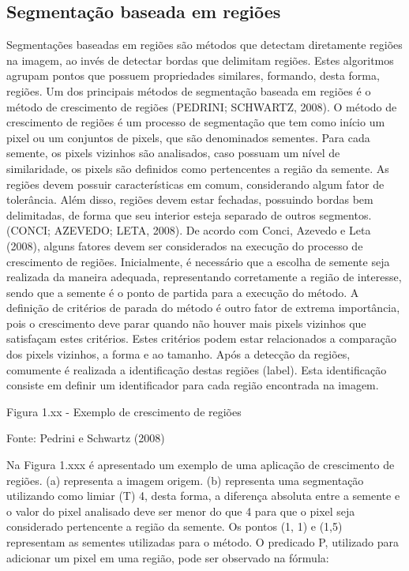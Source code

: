 \documentclass[
	12pt,				%
	oneside,			%
	a4paper,			%
	english,			%
	french,				%
	spanish,			%
	brazil,				%
	]{abntex2}
\begin{document}
\subsection{Segmentação baseada em regiões}     

	Segmentações baseadas em regiões são métodos que detectam diretamente regiões na imagem, ao invés de detectar bordas que delimitam regiões. Estes algoritmos agrupam pontos que possuem propriedades similares, formando, desta forma, regiões. Um dos principais métodos de segmentação baseada em regiões é o método de crescimento de regiões (PEDRINI; SCHWARTZ, 2008).
	O método de crescimento de regiões é um processo de segmentação que tem como início um pixel ou um conjuntos de pixels, que são denominados sementes. Para cada semente, os pixels vizinhos são analisados, caso possuam um nível de similaridade, os pixels são definidos como pertencentes a região da semente. As regiões devem possuir características em comum, considerando algum fator de tolerância. Além disso, regiões devem estar fechadas, possuindo bordas bem delimitadas, de forma que seu interior esteja separado de outros segmentos. (CONCI; AZEVEDO; LETA, 2008).
De acordo com Conci, Azevedo e Leta (2008), alguns fatores devem ser considerados na execução do processo de crescimento de regiões. Inicialmente, é necessário que a escolha de semente seja realizada da maneira adequada, representando corretamente a região de interesse, sendo que a semente é o ponto de partida para a execução do método. A definição de critérios de parada do método é outro fator de extrema importância, pois o crescimento deve parar quando não houver mais pixels vizinhos que satisfaçam estes critérios. Estes critérios podem estar relacionados a comparação dos pixels vizinhos, a forma e ao tamanho.
Após a detecção da regiões, comumente é realizada a identificação destas regiões (label). Esta identificação consiste em definir um identificador para cada região encontrada na imagem. 

Figura 1.xx - Exemplo de crescimento de regiões

Fonte: Pedrini e Schwartz (2008)	

Na Figura 1.xxx é apresentado um exemplo de uma aplicação de crescimento de regiões. (a) representa a imagem origem. (b) representa uma segmentação utilizando como limiar (T) 4, desta forma, a diferença absoluta entre a semente e o valor do pixel analisado deve ser menor do que 4 para que o pixel seja considerado pertencente a região da semente. Os pontos (1, 1) e (1,5) representam as sementes utilizadas para o método. O predicado P, utilizado para adicionar um pixel em uma região, pode ser observado na fórmula:
\end{document}
